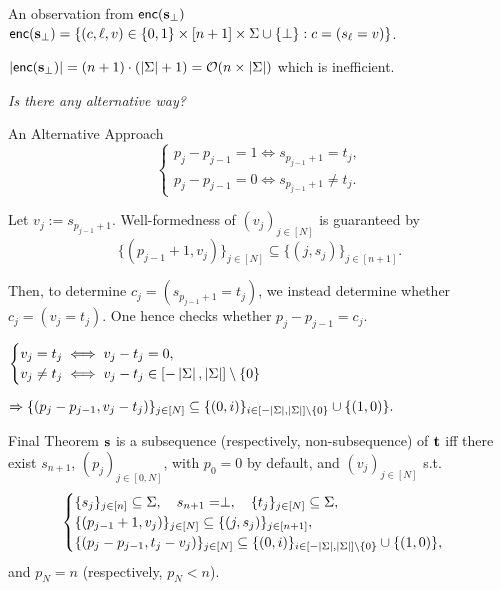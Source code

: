 \begin{frame}{An observation from $\mathsf{enc}(\mathbf{s}_\perp)$}
	$\mathsf{enc}(\mathbf{s}_\perp)  = \{(c, \ell, v) \in \{0,1\}\times[n+1]\times\Sigma\cup\{\perp\} : c = (s_\ell = v)\}$.
	
	$\left|\mathsf{enc}(\mathbf{s}_\perp)\right| = (n + 1)\cdot (\left|\Sigma\right| + 1) = \mathcal{O}(n \times \left|\Sigma\right|)$ which is inefficient.
	
	\pause
	\begin{center}
		\emph{Is there any alternative way?}
	\end{center}
\end{frame}

\begin{frame}{An Alternative Approach}
	\begin{equation*}
		\begin{cases}
			p_j - p_{j - 1} = 1 \iff s_{p_{j - 1} + 1} = t_j,\\ 
			p_j - p_{j - 1} = 0 \iff s_{p_{j - 1} + 1} \not= t_j.
		\end{cases}
	\end{equation*}
	
	Let $v_j := s_{p_{j - 1} + 1}$. Well-formedness of $(v_j)_{j \in [N]}$ is guaranteed by
	\begin{equation*}
		\{(p_{j - 1} + 1, v_j)\}_{j \in [N]} \subseteq \{(j, s_j)\}_{j \in [n + 1]}.
	\end{equation*}
	
	Then, to determine $ c_j = (s_{p_{j - 1} + 1} = t_j)$, we instead determine whether $c_j = (v_j = t_j)$. One hence checks whether $p_j - p_{j - 1} = c_j$.
	
	$
		\begin{cases}
			v_j = t_j \iff v_j - t_j = 0,\\ v_j\not=t_j\iff v_j - t_j \in [-\left|\Sigma\right|, \left|\Sigma\right|]\setminus\{0\}
		\end{cases}
	$ 
	
	$
		\Rightarrow \{(p_j - p_{j - 1}, v_j - t_j)\}_{j \in [N]} \subseteq \{(0, i)\}_{i \in [-\left|\Sigma\right|, \left|\Sigma\right|]\setminus\{0\}} \cup \{(1, 0)\}.
	$
\end{frame}

\begin{frame}{Final Theorem}
	$\mathbf{s}$ is a subsequence (respectively, non-subsequence) of $\mathbf{t}$  iff there exist $s_{n+1}$, $(p_j)_{j \in [0, N]}$, with $p_0=0$ by default,  and $(v_j)_{j \in [N]}$ s.t.
	\begin{equation*}%
		\begin{cases}
			\{s_j\}_{j \in [n]} \subseteq \Sigma,\quad s_{n+1} = \perp,\quad \{t_j\}_{j \in [N]} \subseteq \Sigma,\\
			\{(p_{j - 1} + 1, v_j)\}_{j \in [N]} \subseteq \{(j, s_j)\}_{j \in [n+1]},\\
			\{(p_j - p_{j - 1}, t_j - v_j)\}_{j \in [N]} \subseteq \{(0,i)\}_{i \in [-\size{\Sigma}, \size{\Sigma}]\setminus\{0\}} \cup \{(1, 0)\},
		\end{cases}
	\end{equation*}
	and $p_N = n$ (respectively, $p_N < n$).
\end{frame}